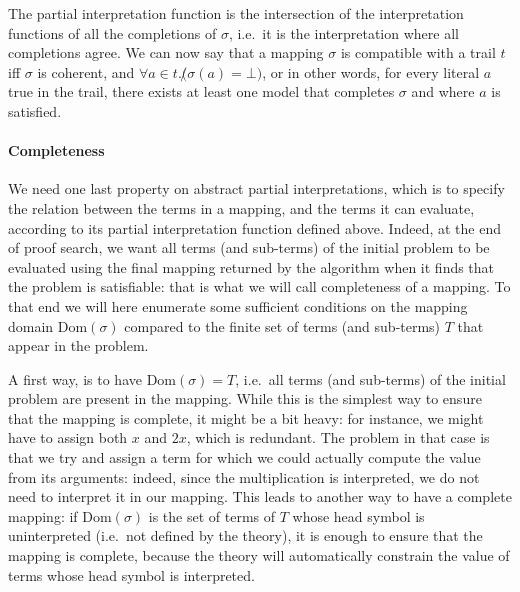 \documentclass{article}
\begin{document}
The partial interpretation function is the intersection of the interpretation
functions of all the completions of $\sigma$, i.e.~it is the interpretation
where all completions agree. We can now say that a mapping $\sigma$ is compatible
with a trail $t$ iff $\sigma$ is coherent, and
$\forall a \in t. \not (\sigma(a) = \bot)$, or in other words, for every literal $a$
true in the trail, there exists at least one model that completes $\sigma$ and where
$a$ is satisfied.

\paragraph{Completeness}
We need one last property on abstract partial interpretations, which is to
specify the relation between the terms in a mapping, and the terms it can evaluate,
according to its partial interpretation function defined above. Indeed, at the end
of proof search, we want all terms (and sub-terms) of the initial problem to be
evaluated using the final mapping returned by the algorithm when it finds that the
problem is satisfiable: that is what we will call completeness of a mapping.
To that end we will here enumerate some sufficient conditions on the mapping domain
$\text{Dom}(\sigma)$ compared to the finite set of terms (and sub-terms) $T$ that
appear in the problem.

A first way, is to have $\text{Dom}(\sigma) = T$, i.e.~all terms (and sub-terms) of the
initial problem are present in the mapping. While this is the simplest way to ensure that
the mapping is complete, it might be a bit heavy: for instance, we might have to assign
both $x$ and $2x$, which is redundant. The problem in that case is that we try and assign
a term for which we could actually compute the value from its arguments: indeed,
since the multiplication is interpreted, we do not need to interpret it in our mapping.
This leads to another way to have a complete mapping: if $\text{Dom}(\sigma)$ is the
set of terms of $T$ whose head symbol is uninterpreted (i.e.~not defined by the theory),
it is enough to ensure that the mapping is complete, because the theory will automatically
constrain the value of terms whose head symbol is interpreted.





\clearpage
\appendix
\end{document}
